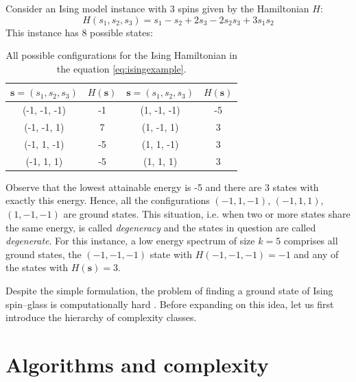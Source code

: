 \begin{example}
  Consider an Ising model instance with 3 spins given by the Hamiltonian $H$:
  \begin{equation}
    \label{eq:isingexample}
    H(s_1, s_2, s_3) = s_1 - s_2 +2s_3 - 2s_2s_3 + 3s_1s_2
  \end{equation}
  This instance has 8 possible states:

  \begin{table}[h]
    \begin{center}
      \begin{tabular}{|c|c||c|c|}
        \hline
        \rowcolor{theader}
        $\mathbf{s}=(s_1, s_2, s_3)$ &
        $H(\mathbf{s})$              &
        $\mathbf{s}=(s_1, s_2, s_3)$ &
        $H(\mathbf{s})$                                      \\\hline
        (-1, -1, -1)                 & -1 & (1, -1, -1) & -5 \\ \hline
        (-1, -1, 1)                  & 7  & (1, -1, 1)  & 3  \\ \hline
        (-1, 1, -1)                  & -5 & (1, 1, -1)  & 3  \\ \hline
        (-1, 1, 1)                   & -5 & (1, 1, 1)   & 3  \\ \hline
      \end{tabular}
    \end{center}
    \caption{All possible configurations for the Ising Hamiltonian in the equation
      \eqref{eq:isingexample}.} \label{tab:isingexample}
  \end{table}
  Observe that the lowest attainable energy is -5 and there are 3 states with
  exactly this energy. Hence, all the configurations $(-1, 1, -1)$, $(-1, 1, 1)$,
  $(1, -1, -1)$ are ground states. This situation, i.e. when two or more states
  share the same energy, is called \emph{degeneracy} and the states in question
  are called \emph{degenerate}. For this instance, a low energy spectrum of size
  $k=5$ comprises all ground states, the $(-1, -1, -1)$ state with $H(-1, -1, -1)
    = -1$ and any of the states with $H(\mathbf{s})=3$.
\end{example}

Despite the simple formulation, the problem of finding a ground state of Ising
spin--glass is computationally hard \cite{barahoma}. Before expanding on this
idea, let us first introduce the hierarchy of complexity classes.

\section{Algorithms and complexity}

